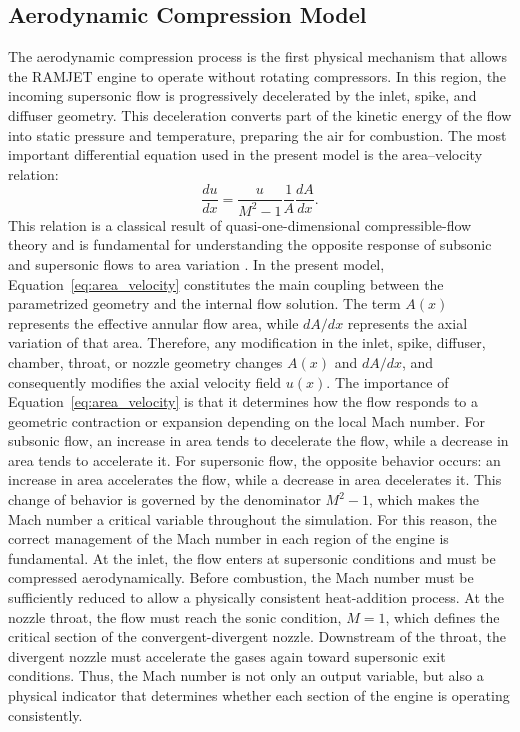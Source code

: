 \documentclass[preprint,12pt]{elsarticle}
\begin{document}
\subsection{Aerodynamic Compression Model}
The aerodynamic compression process is the first physical mechanism that allows the RAMJET engine to operate without rotating compressors. In this region, the incoming supersonic flow is progressively decelerated by the inlet, spike, and diffuser geometry. This deceleration converts part of the kinetic energy of the flow into static pressure and temperature, preparing the air for combustion.
The most important differential equation used in the present model is the area--velocity relation:
\begin{equation}
\frac{du}{dx}
=
\frac{u}{M^2-1}
\frac{1}{A}
\frac{dA}{dx}.
\label{eq:area_velocity}
\end{equation}
This relation is a classical result of quasi-one-dimensional compressible-flow theory and is fundamental for understanding the opposite response of subsonic and supersonic flows to area variation \cite{Anderson1990}. In the present model, Equation~\eqref{eq:area_velocity} constitutes the main coupling between the parametrized geometry and the internal flow solution. The term $A(x)$ represents the effective annular flow area, while $dA/dx$ represents the axial variation of that area. Therefore, any modification in the inlet, spike, diffuser, chamber, throat, or nozzle geometry changes $A(x)$ and $dA/dx$, and consequently modifies the axial velocity field $u(x)$.
The importance of Equation~\eqref{eq:area_velocity} is that it determines how the flow responds to a geometric contraction or expansion depending on the local Mach number. For subsonic flow, an increase in area tends to decelerate the flow, while a decrease in area tends to accelerate it. For supersonic flow, the opposite behavior occurs: an increase in area accelerates the flow, while a decrease in area decelerates it. This change of behavior is governed by the denominator $M^2-1$, which makes the Mach number a critical variable throughout the simulation.
For this reason, the correct management of the Mach number in each region of the engine is fundamental. At the inlet, the flow enters at supersonic conditions and must be compressed aerodynamically. Before combustion, the Mach number must be sufficiently reduced to allow a physically consistent heat-addition process. At the nozzle throat, the flow must reach the sonic condition, $M=1$, which defines the critical section of the convergent-divergent nozzle. Downstream of the throat, the divergent nozzle must accelerate the gases again toward supersonic exit conditions. Thus, the Mach number is not only an output variable, but also a physical indicator that determines whether each section of the engine is operating consistently.
\end{document}
